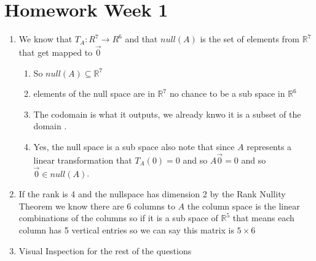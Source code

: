 \documentclass[11pt]{book}
\begin{document}

\chapter{Homework Week 1}%
\label{chp:homework_week_1}

\begin{enumerate}
    \item We know that $T_{A}  : R^{7}  \to R^{6}  $ and that $\mathit{null} \left(A\right) $ is the set of elements from $\mathbb{R} ^{7} $ that get mapped to $\vec{0} $
        \begin{enumerate}
            \item So $\mathit{null} \left(A\right) \subseteq \mathbb{R} ^{7} $ 
            \item elements  of the null space are in $\mathbb{R} ^{7} $ no chance to be a sub space in $\mathbb{R} ^{6} $ 
            \item The codomain is what it outputs, we already knwo it is a subset of the domain .
        \item Yes, the null space is a sub space also note that since $A$ represents a linear transformation that $T_{A} \left(0\right) = 0$ and so $A\vec{0} = 0$ and so $\vec{0} \in \mathit{null} \left(A\right) $. 
        \end{enumerate}
    \item If the rank is 4 and the nullspace has dimension 2 by the Rank Nullity Theorem we know there are 6 columns to $A$ the column space is the linear combinations of the columns so if it is a sub space of $\mathbb{R} ^{5} $    that means each column has 5 vertical entries so we can say this matrix is $5 \times 6$ 
    \item Visual Inspection for the rest of the questions
\end{enumerate}


\end{document}
